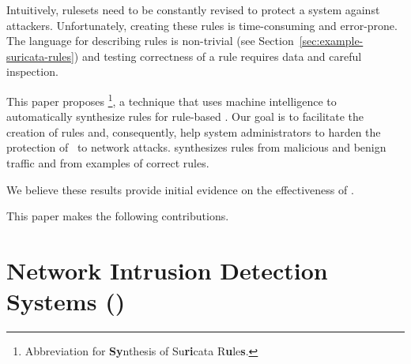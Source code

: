 \documentclass[sigconf,review, anonymous]{acmart}
\begin{document}

Intuitively, rulesets need to be constantly revised to protect a
system against attackers. Unfortunately, creating these rules is
time-consuming and error-prone. The language for describing rules is
non-trivial (see Section~\ref{sec:example-suricata-rules}) and testing
correctness of a rule requires data and careful inspection.



This paper proposes \tname{}\footnote{Abbreviation for
  \textbf{Sy}nthesis of Su\textbf{ri}cata R\textbf{u}le\textbf{s}.}, a
technique that uses machine intelligence to automatically synthesize
rules for rule-based \nids. Our goal is to facilitate the creation of
rules and, consequently, help system administrators to harden the
protection of \nids\ to network attacks. \tname{} synthesizes rules
from malicious and benign traffic and from examples of correct rules.






 We believe these results provide initial
evidence on the effectiveness of \tname{}.

This paper makes the following contributions.

\section{Network Intrusion Detection Systems (\nids)}
\label{sec:background}
\end{document}
